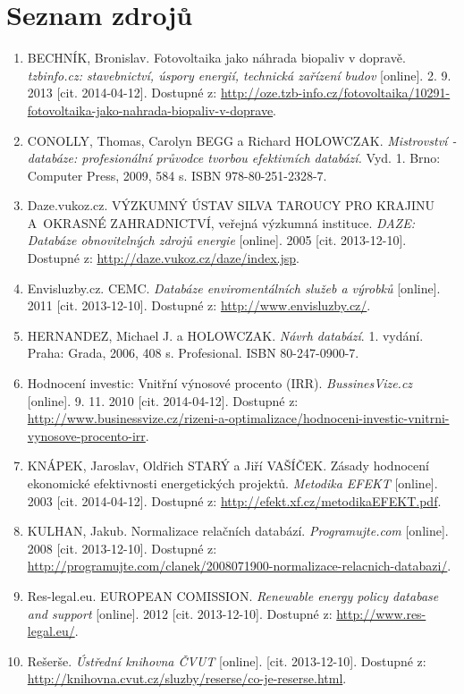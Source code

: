 \documentclass[11pt,a4paper]{article}
\begin{document}
\newpage
\section{Seznam zdrojů}
\begin{enumerate}
\item  BECHNÍK, Bronislav. Fotovoltaika jako náhrada biopaliv v dopravě. \textit{tzbinfo.cz: stavebnictví, úspory energií, technická zařízení budov} [online]. 2. 9. 2013 [cit. 2014-04-12]. Dostupné z: \url{http://oze.tzb-info.cz/fotovoltaika/10291-fotovoltaika-jako-nahrada-biopaliv-v-doprave}.
\item CONOLLY, Thomas, Carolyn BEGG a Richard HOLOWCZAK. \textit{Mistrovství - databáze: profesionální průvodce tvorbou efektivních databází.} Vyd. 1. Brno: Computer Press, 2009, 584 s. ISBN 978-80-251-2328-7.
\item Daze.vukoz.cz. VÝZKUMNÝ ÚSTAV SILVA TAROUCY PRO KRAJINU A~OKRASNÉ ZAHRADNICTVÍ, veřejná výzkumná instituce. \textit{DAZE: Databáze obnovitelných zdrojů energie} [online]. 2005 [cit. 2013-12-10]. Dostupné z: \url{http://daze.vukoz.cz/daze/index.jsp}.
\item Envisluzby.cz. CEMC. \textit{Databáze enviromentálních služeb a výrobků} [online]. 2011 [cit. 2013-12-10]. Dostupné z: \url{http://www.envisluzby.cz/}. 
\item HERNANDEZ, Michael J. a HOLOWCZAK. \textit{Návrh databází}. 1. vydání. Praha: Grada, 2006, 408 s. Profesional. ISBN 80-247-0900-7.
\item Hodnocení investic: Vnitřní výnosové procento (IRR).  \textit{BussinesVize.cz} [online]. 9. 11. 2010 [cit. 2014-04-12]. Dostupné z: \url{http://www.businessvize.cz/rizeni-a-optimalizace/hodnoceni-investic-vnitrni-vynosove-procento-irr}.
\item KNÁPEK, Jaroslav, Oldřich STARÝ a Jiří VAŠÍČEK. Zásady hodnocení ekonomické efektivnosti energetických projektů. \textit{Metodika EFEKT} [online]. 2003 [cit. 2014-04-12]. Dostupné z: \url{http://efekt.xf.cz/metodikaEFEKT.pdf}.
\item KULHAN, Jakub. Normalizace relačních databází. \textit{Programujte.com} [online]. 2008 [cit. 2013-12-10]. Dostupné z: \url{http://programujte.com/clanek/2008071900-normalizace-relacnich-databazi/}.
\item Res-legal.eu. EUROPEAN COMISSION. \textit{Renewable energy policy database and support} [online]. 2012 [cit. 2013-12-10]. Dostupné z: \url{http://www.res-legal.eu/}. 
\item Rešerše. \textit{Ústřední knihovna ČVUT} [online]. [cit. 2013-12-10]. Dostupné z: \url{http://knihovna.cvut.cz/sluzby/reserse/co-je-reserse.html}.

\end{enumerate}
\end{document}
